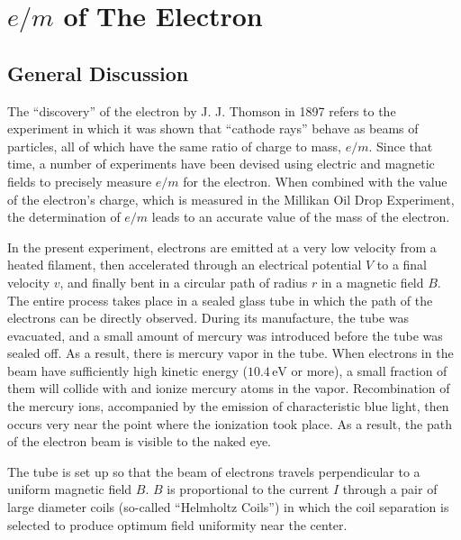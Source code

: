 \chapter{$e/ m$ of The Electron}
\section{General Discussion}
The ``discovery'' of the electron by J. J. Thomson in 1897 refers to the experiment in which it was shown that ``cathode rays'' behave as beams of particles, all of which have the same ratio of charge to mass, $e/m$. Since that time, a number of experiments have been devised using electric and magnetic fields to precisely measure $e/m$ for the electron. When combined with the value of the electron's charge, which is measured in the Millikan Oil Drop Experiment, the determination of $e/m$ leads to an accurate value of the mass of the electron.\myskip

In the present experiment, electrons are emitted at a very low velocity from a heated filament, then accelerated through an electrical potential $V$ to a final velocity $v$, and finally bent in a circular path of radius $r$ in a magnetic field $B$. The entire process takes place in a sealed glass tube in which the path of the electrons can be directly observed. During its manufacture, the tube was evacuated, and a small amount of mercury was introduced before the tube was sealed off. As a result, there is mercury vapor in the tube. When electrons in the beam have sufficiently high kinetic energy ($10.4\,\mathrm{eV}$ or more), a small fraction of them will collide with and ionize mercury atoms in the vapor. Recombination of the mercury ions, accompanied by the emission of characteristic blue light, then occurs very near the point where the ionization took place. As a result, the path of the electron beam is visible to the naked eye. \myskip

The tube is set up so that the beam of electrons travels perpendicular to a uniform magnetic field $B$. $B$ is proportional to the current $I$ through a pair of large diameter coils (so-called ``Helmholtz Coils'') in which the coil separation is selected to produce optimum field uniformity near the center.


